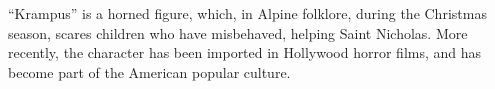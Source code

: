 ``Krampus'' is a horned figure, which, in Alpine folklore, during the Christmas season, scares children who have misbehaved, helping Saint Nicholas.
More recently, the character has been imported in Hollywood horror films, and has become part of the American popular culture.